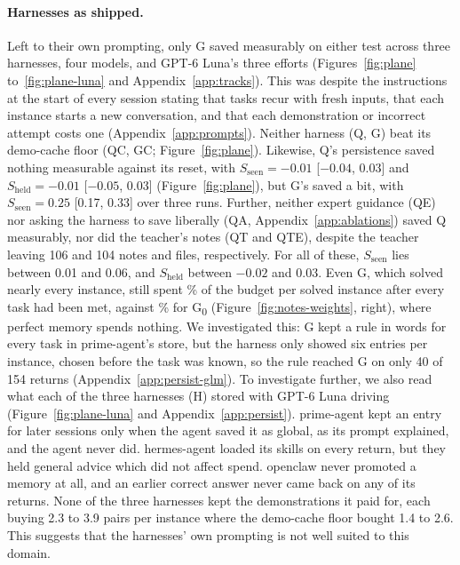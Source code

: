 \paragraph{Harnesses as shipped.}
Left to their own prompting, only G saved measurably on either test across three harnesses, four models, and GPT-6 Luna's three efforts (Figures~\ref{fig:plane} to~\ref{fig:plane-luna} and Appendix~\ref{app:tracks}). This was despite the instructions at the start of every session stating that tasks recur with fresh inputs, that each instance starts a new conversation, and that each demonstration or incorrect attempt costs one (Appendix~\ref{app:prompts}). Neither harness (Q, G) beat its demo-cache floor (QC, GC; Figure~\ref{fig:plane}). Likewise, Q's persistence saved nothing measurable against its reset, with $S_{\mathrm{seen}} = -0.01$ [$-0.04$, 0.03] and $S_{\mathrm{held}} = -0.01$ [$-0.05$, 0.03] (Figure~\ref{fig:plane}), but G's saved a bit, with $S_{\mathrm{seen}} = 0.25$ [0.17, 0.33] over three runs. Further, neither expert guidance (QE) nor asking the harness to save liberally (QA, Appendix~\ref{app:ablations}) saved Q measurably, nor did the teacher's notes (QT and QTE), despite the teacher leaving 106 and 104 notes and files, respectively. For all of these, $S_{\mathrm{seen}}$ lies between 0.01 and 0.06, and $S_{\mathrm{held}}$ between $-0.02$ and 0.03. Even G, which solved nearly every instance, still spent \sbGlmHCost{}\% of the budget per solved instance after every task had been met, against \sbGlmHzeroCost{}\% for G\textsubscript{0} (Figure~\ref{fig:notes-weights}, right), where perfect memory spends nothing. We investigated this: G kept a rule in words for every task in prime-agent's store, but the harness only showed six entries per instance, chosen before the task was known, so the rule reached G on only 40 of 154 returns (Appendix~\ref{app:persist-glm}). To investigate further, we also read what each of the three harnesses (H) stored with GPT-6 Luna driving (Figure~\ref{fig:plane-luna} and Appendix~\ref{app:persist}). prime-agent kept an entry for later sessions only when the agent saved it as global, as its prompt explained, and the agent never did. hermes-agent loaded its skills on every return, but they held general advice which did not affect spend. openclaw never promoted a memory at all, and an earlier correct answer never came back on any of its returns. None of the three harnesses kept the demonstrations it paid for, each buying 2.3 to 3.9 pairs per instance where the demo-cache floor bought 1.4 to 2.6. This suggests that the harnesses' own prompting is not well suited to this domain.

